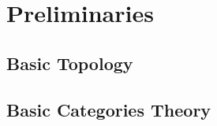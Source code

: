 \chapter{Preliminaries}

\section{Basic Topology}



\section{Basic Categories Theory}





\addtocounter{section}{1}







